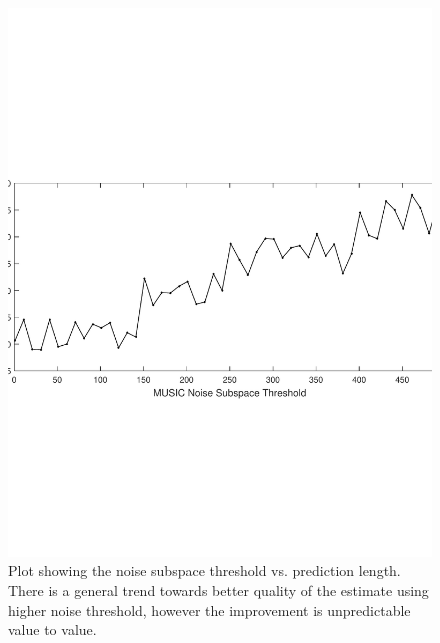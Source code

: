 \documentclass{allertonproc}
\begin{document}
\begin{figure}[ptb]
\begin{center}
\includegraphics[width=6in]{musicNoise}
\caption{Plot showing the noise subspace threshold vs. prediction length. There is a general trend towards better quality of the estimate using higher noise threshold, however the improvement is unpredictable value to value.}\label{thresh}
\end{center}
\end{figure}
\end{document}
